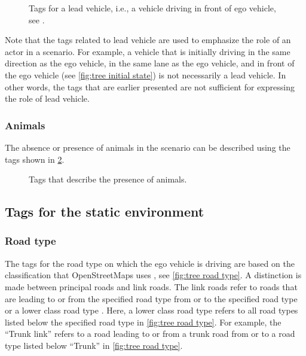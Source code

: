 \begin{figure}
	\centering
	\caption{Tags for a lead vehicle, i.e., a vehicle driving in front of ego vehicle, see \cite{degelder2018ontology}.}
	\label{fig:tree lead vehicle}
\end{figure}

Note that the tags related to lead vehicle are used to emphasize the role of an actor in a scenario. For example, a vehicle that is initially driving in the same direction as the ego vehicle, in the same lane as the ego vehicle, and in front of the ego vehicle (see \cref{fig:tree initial state}) is not necessarily a lead vehicle. In other words, the tags that are earlier presented are not sufficient for expressing the role of lead vehicle.

\subsubsection{Animals}
The absence or presence of animals in the scenario can be described using the tags shown in \cref{fig:tree animals}. 

\begin{figure}
	\centering
	\caption{Tags that describe the presence of animals.}
	\label{fig:tree animals}
\end{figure}



\subsection{Tags for the static environment}
\label{sec:tags selection static}

\subsubsection{Road type}
The tags for the road type on which the ego vehicle is driving are based on the classification that OpenStreetMaps uses \cite{osm_highway}, see \cref{fig:tree road type}. A distinction is made between principal roads and link roads. The link roads refer to roads that are leading to or from the specified road type from or to the specified road type or a lower class road type \cite{osm_highway}. Here, a lower class road type refers to all road types listed below the specified road type in \cref{fig:tree road type}. For example, the ``Trunk link'' refers to a road leading to or from a trunk road from or to a road type listed below ``Trunk'' in \cref{fig:tree road type}.

